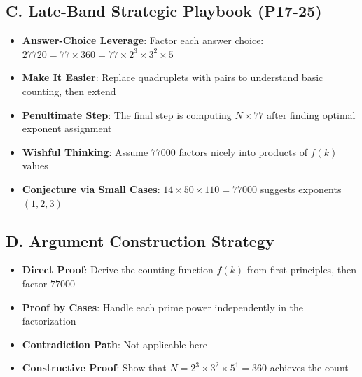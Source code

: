 \documentclass[11pt]{article}
\begin{document}
\begin{strategicbox}
\subsection*{C. Late-Band Strategic Playbook (P17-25)}
\begin{itemize}[leftmargin=*]
    \item \textbf{Answer-Choice Leverage}: Factor each answer choice: $27720 = 77 \times 360 = 77 \times 2^3 \times 3^2 \times 5$
    \item \textbf{Make It Easier}: Replace quadruplets with pairs to understand basic counting, then extend
    \item \textbf{Penultimate Step}: The final step is computing $N \times 77$ after finding optimal exponent assignment
    \item \textbf{Wishful Thinking}: Assume $77000$ factors nicely into products of $f(k)$ values
    \item \textbf{Conjecture via Small Cases}: $14 \times 50 \times 110 = 77000$ suggests exponents $(1,2,3)$
\end{itemize}

\subsection*{D. Argument Construction Strategy}
\begin{itemize}[leftmargin=*]
    \item \textbf{Direct Proof}: Derive the counting function $f(k)$ from first principles, then factor $77000$
    \item \textbf{Proof by Cases}: Handle each prime power independently in the factorization
    \item \textbf{Contradiction Path}: Not applicable here
    \item \textbf{Constructive Proof}: Show that $N = 2^3 \times 3^2 \times 5^1 = 360$ achieves the count
\end{itemize}
\end{strategicbox}
\end{document}

